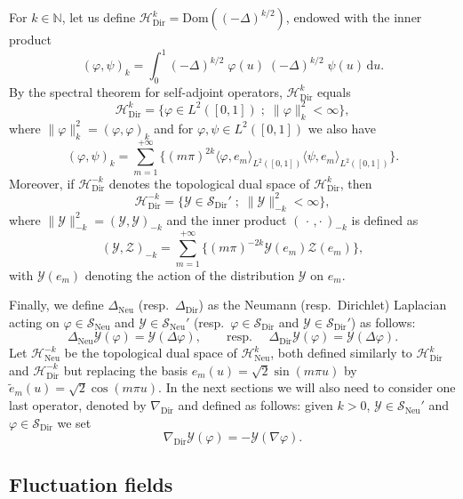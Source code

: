 \documentclass[AHL,Unicode,longabstracts]{cedram}
\DeclareMathOperator{\Dir}{Dir}
\DeclareMathOperator{\Neu}{Neu}
\newcommand{\mc}[1]{{\mathcal #1}}
\renewcommand{\mc}[1]{{\mathcal #1}}
\newcommand{\SD}{\ensuremath{\mc S_{\Dir}}}
\newcommand{\SN}{\ensuremath{\mc S_{\Neu}}}
\renewcommand{\tilde}{\widetilde}
\newcommand*{\dd}{\mathrm{d}}
\newcommand*{\du}{\dd u}
\begin{document}
For $k\in\mathbb{N}$, let us define ${\mathcal{H}_{\Dir}^k}=\mathrm{Dom}((-\Delta)^{k/2})$, endowed with the inner product
\[
(\varphi,\psi)_k=\int_0^1(-\Delta)^{k/2}\;\varphi(u)\;(-\Delta)^{k/2}\;\psi(u)\, \du.
\]
By the spectral theorem for self-adjoint operators, ${\mathcal{H}_{\Dir}^k}$ equals
\begin{equation*}
{\mathcal{H}_{\Dir}^k} = \Big\{\varphi\in L^2([0,1])\; ;\;
\|\varphi\|_k^2<\infty\Big\},
\end{equation*}
where $\|\varphi\|_k^2=(\varphi,\varphi)_k$ and for $\varphi,\psi\in L^2([0,1])$ we also have
\begin{equation*}
(\varphi,\psi)_k = \sum_{m=1}^{+\infty}\bigg\{(m\pi)^{2k}\langle\varphi,e_m\rangle_{L^2([0,1])}\langle\psi,e_m\rangle_{L^2([0,1])}\bigg\}.
\end{equation*}
Moreover, if ${\mathcal{H}_{\Dir}^{-k}}$ denotes the topological dual space of ${\mathcal{H}_{\Dir}^k}$, then
\[
{\mathcal{H}_{\Dir}^{-k}}= \Big\{\mc Y \in \SD' \; ;\;\|\mc Y\|_{-k}^2<\infty\Big\},
\]
where $\|\mc Y\|_{-k}^2=(\mc Y,\mc Y)_{-k}$ and the inner product $({\,\cdot\,,\cdot\,})_{-k}$ is defined as
\begin{equation}
(\mc Y,\mc Z)_{-k} = \sum_{m=1}^{+\infty}\Big\{(m\pi)^{-2k} \mc Y(e_m)\mc Z(e_m)\Big\}, \label{eq:norm-k}
\end{equation}
with $ \mc Y(e_m)$ denoting the action of the distribution $\mc Y$ on $e_m$.


Finally, we define $\Delta_{\Neu}$ (resp.~$\Delta_{\Dir}$) as the Neumann (resp.~Dirichlet) Laplacian acting on $\varphi\in\SN$ and $\mc Y\in\SN'$ (resp.~$\varphi \in \SD$ and $\mc Y \in \SD'$) as follows:
\[
\Delta_{\Neu} \mc Y(\varphi) = \mc Y(\Delta \varphi), \qquad \text{resp. } \quad \Delta_{\Dir} \mc Y(\varphi) = \mc Y(\Delta \varphi).
\]
Let ${\mathcal{H}_{\Neu}^{-k}}$ be the topological dual space of $\mc H_{\Neu}^k$, both defined similarly to $\mc H_{\Dir}^k$ and ${\mathcal{H}_{\Dir}^{-k}}$ but replacing the basis $e_m(u)=\sqrt{2}\sin(m\pi u)$ by ${\tilde{e}_m(u)}=\sqrt{2}\cos(m\pi u)$. In the next sections we will also need to consider one last operator, denoted by $\nabla_{\Dir}$ and defined as follows: given $k > 0$, $\mc Y \in\SN'$ and $\varphi \in\SD$ we set
\begin{equation}\label{eq:nabladir}
\nabla_{\Dir} \mc Y(\varphi) = - \mc Y(\nabla \varphi).
\end{equation}



\subsection{Fluctuation fields}\label{sec:fields}
\end{document}
